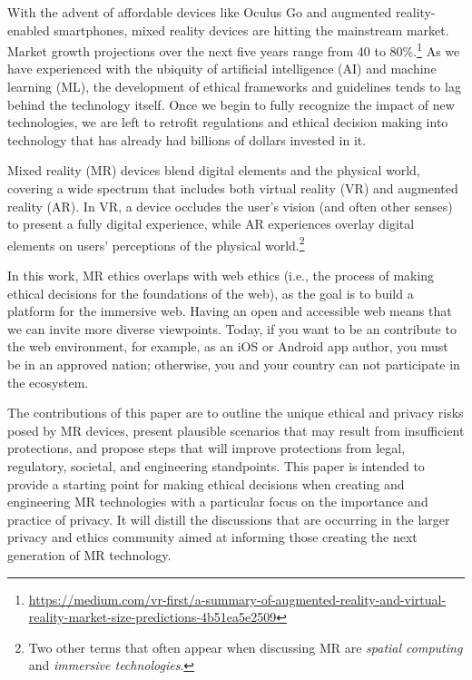 With the advent of affordable devices like Oculus Go and augmented reality-enabled smartphones, mixed reality devices are hitting the mainstream market. Market growth projections over the next five years range from 40 to 80\%.\footnote{\url{https://medium.com/vr-first/a-summary-of-augmented-reality-and-virtual-reality-market-size-predictions-4b51ea5e2509}} As we have experienced with the ubiquity of artificial intelligence (AI) and machine learning (ML), the development of ethical frameworks and guidelines tends to lag behind the technology itself. Once we begin to fully recognize the impact of new technologies, we are left to retrofit regulations and ethical decision making into technology that has already had billions of dollars invested in it.

Mixed reality (MR) devices blend digital elements and the physical world, covering a wide spectrum that includes both virtual reality (VR) and augmented reality (AR). In VR, a device occludes the user's vision (and often other senses) to present a fully digital experience, while AR experiences overlay digital elements on users' perceptions of the physical world.\footnote{Two other terms that often appear when discussing MR are \emph{spatial computing} and \emph{immersive technologies}.} 

In this work, MR ethics overlaps with web ethics (i.e., the process of making ethical decisions for the foundations of the web), as the goal is to build a platform for the immersive web. Having an open and accessible web means that we can invite more diverse viewpoints. Today, if you want to be an contribute to the web environment, for example, as an iOS or Android app author, you must be in an approved nation; otherwise, you and your country can not participate in the ecosystem.

The contributions of this paper are to outline the unique ethical and privacy risks posed by MR devices, present plausible scenarios that may result from insufficient protections, and propose steps that will improve protections from legal, regulatory, societal, and engineering standpoints. This paper is intended to provide a starting point for making ethical decisions when creating and engineering MR technologies with a particular focus on the importance and practice of privacy. It will distill the discussions that are occurring in the larger privacy and ethics community aimed at informing those creating the next generation of MR technology.

